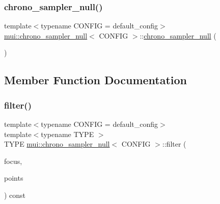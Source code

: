 \subsubsection{\texorpdfstring{chrono\+\_\+sampler\+\_\+null()}{chrono\_sampler\_null()}}
{\footnotesize\ttfamily template$<$typename C\+O\+N\+F\+IG  = default\+\_\+config$>$ \\
\hyperlink{classmui_1_1chrono__sampler__null}{mui\+::chrono\+\_\+sampler\+\_\+null}$<$ C\+O\+N\+F\+IG $>$\+::\hyperlink{classmui_1_1chrono__sampler__null}{chrono\+\_\+sampler\+\_\+null} (\begin{DoxyParamCaption}{ }\end{DoxyParamCaption})\hspace{0.3cm}{\ttfamily [inline]}}



\subsection{Member Function Documentation}
\mbox{\label{classmui_1_1chrono__sampler__null_a168a4636372969c4ac5b2d1134beacef}} 
\subsubsection{\texorpdfstring{filter()}{filter()}}
{\footnotesize\ttfamily template$<$typename C\+O\+N\+F\+IG  = default\+\_\+config$>$ \\
template$<$typename T\+Y\+PE $>$ \\
T\+Y\+PE \hyperlink{classmui_1_1chrono__sampler__null}{mui\+::chrono\+\_\+sampler\+\_\+null}$<$ C\+O\+N\+F\+IG $>$\+::filter (\begin{DoxyParamCaption}\item[{\hyperlink{classmui_1_1chrono__sampler__null_a5a14f1c66478264e3fb50ba4fda7d78c}{time\+\_\+type}}]{focus,  }\item[{const std\+::vector$<$ std\+::pair$<$ \hyperlink{classmui_1_1chrono__sampler__null_a5a14f1c66478264e3fb50ba4fda7d78c}{time\+\_\+type}, T\+Y\+PE $>$ $>$ \&}]{points }\end{DoxyParamCaption}) const\hspace{0.3cm}{\ttfamily [inline]}}

\mbox{\label{classmui_1_1chrono__sampler__null_a75b62ec813645350a5edf91a06e1b7ef}} 

